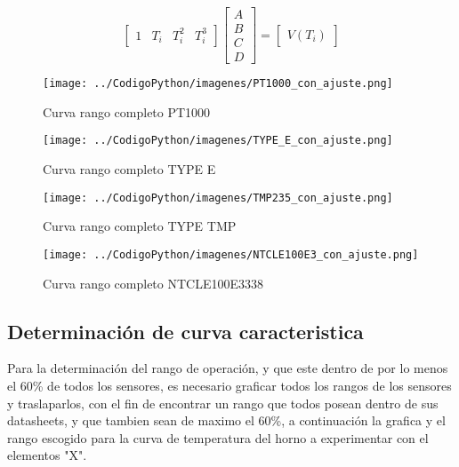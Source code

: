 \documentclass[conference]{IEEEtran}
\begin{document}
\[
\begin{bmatrix} 
	1 & T_i & T_{i}^2 & T_i^3 
\end{bmatrix}
\begin{bmatrix} 
	A \\ 
	B \\
	C \\
	D
\end{bmatrix}
= 
\begin{bmatrix} 
	V(T_{i})
\end{bmatrix}
\]



\begin{figure}[h!]
	\centering
	\texttt{[image: ../CodigoPython/imagenes/PT1000\_con\_ajuste.png]}
	\caption{Curva rango completo PT1000}
	\label{fig:1}
\end{figure}

\begin{figure}[h!]
	\centering
	\texttt{[image: ../CodigoPython/imagenes/TYPE\_E\_con\_ajuste.png]}
	\caption{Curva rango completo TYPE E}
	\label{fig:2}
\end{figure}

\begin{figure}[h!]
	\centering
	\texttt{[image: ../CodigoPython/imagenes/TMP235\_con\_ajuste.png]}
	\caption{Curva rango completo TYPE TMP}
	\label{fig:3}
\end{figure}

\begin{figure}[h!]
	\centering
	\texttt{[image: ../CodigoPython/imagenes/NTCLE100E3\_con\_ajuste.png]}
	\caption{Curva rango completo NTCLE100E3338}
	\label{fig:4}
\end{figure}




\subsection{Determinación de curva caracteristica}

Para la determinación del rango de operación, y que este dentro de por lo menos el 60\% de todos los sensores, es necesario graficar todos los rangos de los sensores y traslaparlos, con el fin de encontrar un rango que todos posean dentro de sus datasheets, y que tambien sean de maximo el 60\%, a continuación la grafica y el rango escogido para la curva de temperatura del horno a experimentar con el elementos "X".\\
\end{document}
